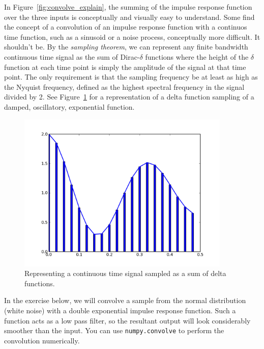 In Figure~\ref{fig:convolve_explain}, the summing of the impulse
response function over the three inputs is conceptually and visually
easy to understand.  Some find the concept of a convolution of an
impulse response function with a continuos time function, such as a
sinusoid or a noise process, conceptually more difficult.  It
shouldn't be.  By the \textit{sampling theorem}, we can represent any
finite bandwidth continuous time signal as the sum of Dirac-$\delta$
functions where the height of the $\delta$ function at each time point
is simply the amplitude of the signal at that time point.  The only
requirement is that the sampling frequency be at least as high as the
Nyquist frequency, defined as the highest spectral frequency in the
signal divided by 2.  See Figure~\ref{fig:convolve_deltas} for a
representation of a delta function sampling of a damped, oscillatory,
exponential function.


\begin{center}%
\begin{figure}
\begin{centering}\includegraphics[width=4in]{fig/convolve_deltas}\par\end{centering}
\caption{\label{fig:convolve_deltas}Representing a continuous time signal sampled as a sum of delta functions.}
\end{figure}
\par\end{center}


In the exercise below, we will convolve a sample from the normal
distribution (white noise) with a double exponential impulse response
function.  Such a function acts as a low pass filter, so the resultant
output will look considerably smoother than the input.  You can use
\texttt{numpy.convolve} to perform the convolution numerically.

